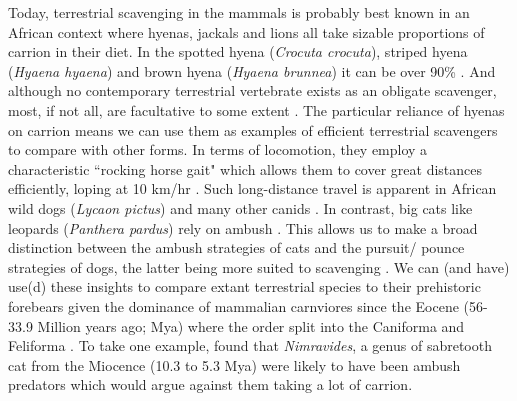 \documentclass[a4paper,12pt]{article}
\begin{document}
Today, terrestrial scavenging in the mammals is probably best known in an African context where hyenas, jackals and lions all take sizable proportions of carrion in their diet.
In the spotted hyena (\textit{Crocuta crocuta}), striped hyena (\textit{Hyaena hyaena}) and brown hyena (\textit{Hyaena brunnea}) it can be over 90\% \citep{jones2015african}.
And although no contemporary terrestrial vertebrate exists as an obligate scavenger, most, if not all, %
 are facultative to some extent \citep{beasley2015vertebrates}.
The particular reliance of hyenas on carrion means we can use them as examples of efficient terrestrial scavengers to compare with other forms. 
In terms of locomotion, they employ a characteristic ``rocking horse gait"  which allows them to cover great distances efficiently, loping at 10 km/hr \citep{mills1989comparative,jones2015african}. 
Such long-distance travel is apparent in African wild dogs (\textit{Lycaon pictus}) and many other canids \citep{pennycuick1995radius,janis2014forelimb}. 
In contrast, big cats like leopards (\textit{Panthera pardus}) rely on ambush \citep{pennycuick1995radius}. 
This allows us to make a broad distinction between the ambush strategies of cats and the pursuit/ pounce strategies of dogs, the latter being more suited to scavenging \citep{janis2014forelimb}. 
We can (and have) use(d) these insights to compare extant terrestrial species to their prehistoric forebears given the dominance of mammalian carnviores since the Eocene (56-33.9 Million years ago; Mya) where the order split into the Caniforma and Feliforma \citep{van1987skeletal}.
To take one example, \cite{anyonge1996locomotor} found that \textit{Nimravides}, a genus of sabretooth cat from the Miocence (10.3 to 5.3 Mya) were likely to have been ambush predators which would argue against them taking a lot of carrion.  

\end{document}
